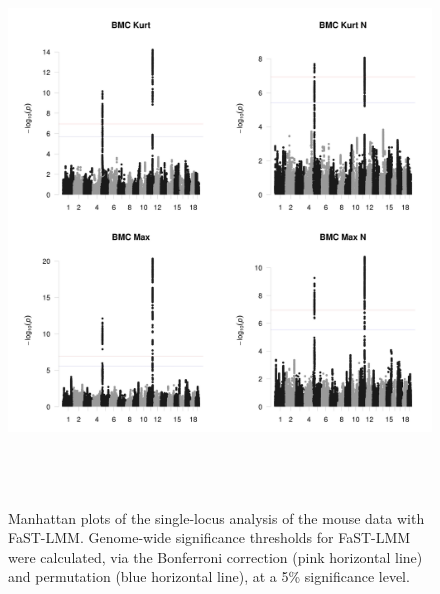 \documentclass{article}
\begin{document}
\begin{figure}
\caption{Manhattan plots of the single-locus analysis of the mouse data with FaST-LMM. 
Genome-wide significance thresholds for FaST-LMM were calculated, via the Bonferroni correction 
(pink horizontal line) and permutation (blue horizontal line), at a 5\% significance level. 
}
\label{supmanhattan}
\begin{center}
\includegraphics[width=15cm, height=15cm]{1.jpeg}
\end{center}
\end{figure}
\end{document}
